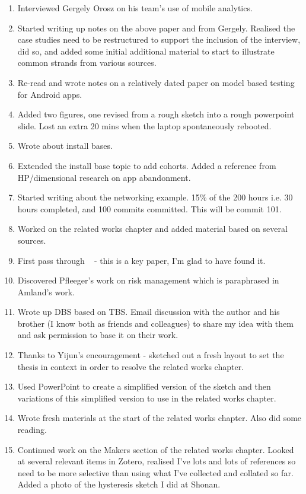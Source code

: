 \begin{enumerate}
    \item Interviewed Gergely Orosz on his team's use of mobile analytics.
    \item Started writing up notes on the above paper and from Gergely. Realised the case studies need to be restructured to support the inclusion of the interview, did so, and added some initial additional material to start to illustrate common strands from various sources.
    \item Re-read and wrote notes on a relatively dated paper on model based testing for Android apps.
    \item Added two figures, one revised from a rough sketch into a rough powerpoint slide. Lost an extra 20 mins when the laptop spontaneously rebooted.
    \item Wrote about install bases.
    \item Extended the install base topic to add cohorts. Added a reference from HP/dimensional research on app abandonment.
    \item Started writing about the networking example. 15\% of the 200 hours i.e. 30 hours completed, and 100 commits committed. This will be commit 101.
    \item Worked on the related works chapter and added material based on several sources.
    \item First pass through ~\citep{avizienis2004_basic_concepts_and_taxonomy} - this is a key paper, I'm glad to have found it.
    \item Discovered Pfleeger's work on risk management which is paraphrased in Amland's work.
    \item Wrote up DBS based on TBS. Email discussion with the author and his brother (I know both as friends and colleagues) to share my idea with them and ask permission to base it on their work.
    \item Thanks to Yijun's encouragement - sketched out a fresh layout to set the thesis in context in order to resolve the related works chapter.
    \item Used PowerPoint to create a simplified version of the sketch and then variations of this simplified version to use in the related works chapter. 
    \item Wrote fresh materials at the start of the related works chapter. Also did some reading.
    \item Continued work on the Makers section of the related works chapter. Looked at several relevant items in Zotero, realised I've lots and lots of references so need to be more selective than using what I've collected and collated so far. Added a photo of the hysteresis sketch I did at Shonan.

\end{enumerate}
